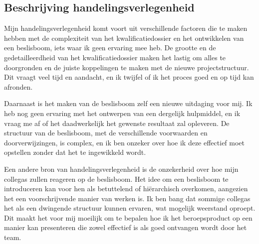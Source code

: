 \subsection{Beschrijving handelingsverlegenheid}
Mijn handelingsverlegenheid komt voort uit verschillende factoren die te maken hebben met de complexiteit van het kwalificatiedossier en het ontwikkelen van een beslisboom, iets waar ik geen ervaring mee heb. De grootte en de gedetailleerdheid van het kwalificatiedossier maken het lastig om alles te doorgronden en de juiste koppelingen te maken met de nieuwe projectstructuur. Dit vraagt veel tijd en aandacht, en ik twijfel of ik het proces goed en op tijd kan afronden.


Daarnaast is het maken van de beslisboom zelf een nieuwe uitdaging voor mij. Ik heb nog geen ervaring met het ontwerpen van een dergelijk hulpmiddel, en ik vraag me af of het daadwerkelijk het gewenste resultaat zal opleveren. De structuur van de beslisboom, met de verschillende voorwaarden en doorverwijzingen, is complex, en ik ben onzeker over hoe ik deze effectief moet opstellen zonder dat het te ingewikkeld wordt.

Een andere bron van handelingsverlegenheid is de onzekerheid over hoe mijn collega\textquotesingle s
 zullen reageren op de beslisboom. Het idee om een beslisboom te introduceren kan voor hen als betuttelend of hiërarchisch overkomen, aangezien het een voorschrijvende manier van werken is. Ik ben bang dat sommige collega\textquotesingle s
 het als een dwingende structuur kunnen ervaren, wat mogelijk weerstand oproept. Dit maakt het voor mij moeilijk om te bepalen hoe ik het beroepsproduct op een manier kan presenteren die zowel effectief is als goed ontvangen wordt door het team.

